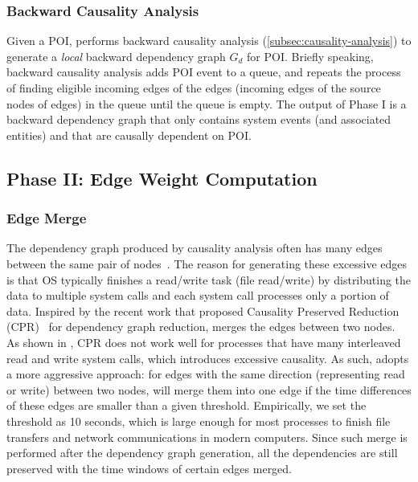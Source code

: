 \subsubsection{Backward Causality Analysis}
\label{subsubsec:backward-causality}

Given a POI, \tool performs backward causality analysis (\cref{subsec:causality-analysis}) to generate a \emph{local} backward dependency graph $G_d$ for POI.
%
Briefly speaking, backward causality analysis adds POI event to a queue, and repeats the process of finding eligible incoming edges of the edges (\ie incoming edges of the source nodes of edges) in the queue until the queue is empty. 
The output of Phase I is a backward dependency graph that only contains system events (and associated entities) and that are causally dependent on POI.

%





\subsection{Phase II: Edge Weight Computation}
\label{subsec:phase2}

\subsubsection{Edge Merge}
\label{subsubsec:edge-merge}

The dependency graph produced by causality analysis often has many edges between the same pair of nodes~\cite{reduction}.
The reason for generating these excessive edges is that OS typically finishes a read/write task (\eg file read/write) by distributing the data to multiple system calls and each system call processes only a portion of data.
Inspired by the recent work that proposed Causality Preserved Reduction (CPR)~\cite{reduction} for dependency graph reduction, \tool merges the edges between two nodes.
As shown in \cite{reduction}, CPR does not work well for processes that have many interleaved read and write system calls, which introduces excessive causality.
As such, \tool adopts a more aggressive approach: for edges with the same direction (\ie representing read or write) between two nodes, 
\tool will merge them into one edge if the time differences of these edges are smaller than a given threshold. 
Empirically, we set the threshold as 10 seconds, which is large enough for most processes to finish file transfers and network communications in modern computers. 
Since such merge is performed after the dependency graph generation, all the dependencies are still preserved with the time windows of certain edges merged. 




